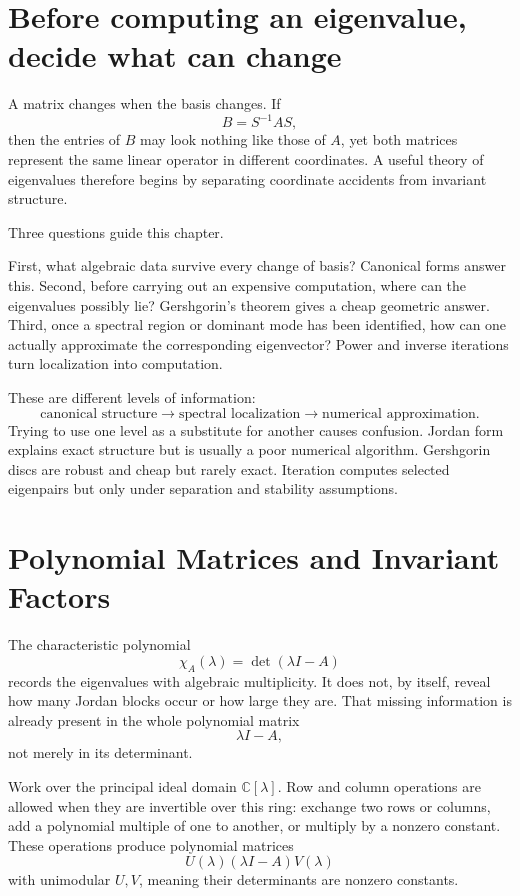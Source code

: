 
\section{Before computing an eigenvalue, decide what can change}

A matrix changes when the basis changes.  If
\[
  B=S^{-1}AS,
\]
then the entries of \(B\) may look nothing like those of \(A\), yet both matrices represent the same linear operator in different coordinates.  A useful theory of eigenvalues therefore begins by separating coordinate accidents from invariant structure.

Three questions guide this chapter.

First, what algebraic data survive every change of basis?  Canonical forms answer this.  Second, before carrying out an expensive computation, where can the eigenvalues possibly lie?  Gershgorin's theorem gives a cheap geometric answer.  Third, once a spectral region or dominant mode has been identified, how can one actually approximate the corresponding eigenvector?  Power and inverse iterations turn localization into computation.

These are different levels of information:
\[
  \text{canonical structure}
  \longrightarrow
  \text{spectral localization}
  \longrightarrow
  \text{numerical approximation}.
\]
Trying to use one level as a substitute for another causes confusion.  Jordan form explains exact structure but is usually a poor numerical algorithm.  Gershgorin discs are robust and cheap but rarely exact.  Iteration computes selected eigenpairs but only under separation and stability assumptions.

\section{Polynomial Matrices and Invariant Factors}

The characteristic polynomial
\[
  \chi_A(\lambda)=\det(\lambda I-A)
\]
records the eigenvalues with algebraic multiplicity.  It does not, by itself, reveal how many Jordan blocks occur or how large they are.  That missing information is already present in the whole polynomial matrix
\[
  \lambda I-A,
\]
not merely in its determinant.

Work over the principal ideal domain \(\mathbb C[\lambda]\).  Row and column operations are allowed when they are invertible over this ring: exchange two rows or columns, add a polynomial multiple of one to another, or multiply by a nonzero constant.  These operations produce polynomial matrices
\[
  U(\lambda)(\lambda I-A)V(\lambda)
\]
with unimodular \(U,V\), meaning their determinants are nonzero constants.

